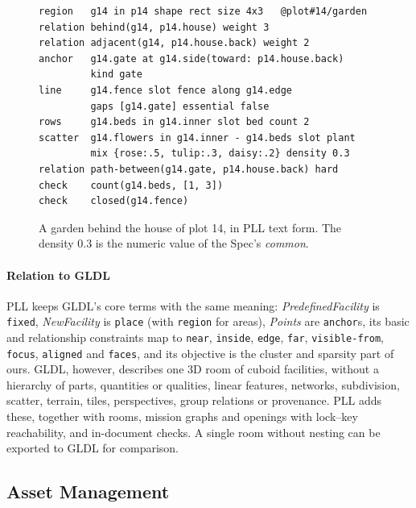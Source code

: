 \documentclass[conference]{IEEEtran}
\newcommand{\pll}[1]{\texttt{#1}}
\begin{document}
\begin{figure}[t]
\scriptsize
\begin{verbatim}
region   g14 in p14 shape rect size 4x3   @plot#14/garden
relation behind(g14, p14.house) weight 3
relation adjacent(g14, p14.house.back) weight 2
anchor   g14.gate at g14.side(toward: p14.house.back)
         kind gate
line     g14.fence slot fence along g14.edge
         gaps [g14.gate] essential false
rows     g14.beds in g14.inner slot bed count 2
scatter  g14.flowers in g14.inner - g14.beds slot plant
         mix {rose:.5, tulip:.3, daisy:.2} density 0.3
relation path-between(g14.gate, p14.house.back) hard
check    count(g14.beds, [1, 3])
check    closed(g14.fence)
\end{verbatim}
\vspace{-6pt}
\caption{A garden behind the house of plot 14, in PLL text form. The density 0.3 is the
numeric value of the Spec's \emph{common}.}
\label{fig:garden}
\end{figure}

\paragraph{Relation to GLDL} PLL keeps GLDL's core terms with the same meaning:
\emph{PredefinedFacility} is \pll{fixed}, \emph{NewFacility} is \pll{place} (with
\pll{region} for areas), \emph{Points} are \pll{anchor}s, its basic and relationship
constraints map to \pll{near}, \pll{inside}, \pll{edge}, \pll{far},
\pll{visible-from}, \pll{focus}, \pll{aligned} and \pll{faces}, and its objective is
the cluster and sparsity part of ours. GLDL, however, describes one 3D room of cuboid
facilities, without a hierarchy of parts, quantities or qualities, linear features,
networks, subdivision, scatter, terrain, tiles, perspectives, group relations or
provenance. PLL adds these, together with rooms, mission graphs and openings with
lock--key reachability, and in-document checks. A single room without nesting can be
exported to GLDL for comparison.

\subsection{Asset Management}
\label{sec:assets}
\end{document}
